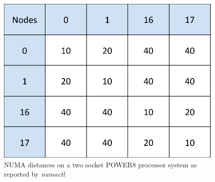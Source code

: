 \begin{figure}[h]
  \centering
  \includegraphics[height=0.3\textwidth]{./Images/crest.pdf}
       \caption{NUMA distances on a two socket POWER8 processor system as reported by \textit{numactl}}
       \label{fig:crest}
\end{figure}


